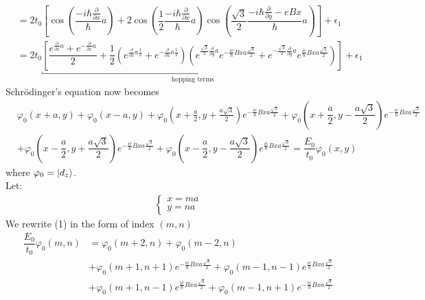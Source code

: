 \documentclass{report}
\newcommand{\f}[2]{\dfrac{#1}{#2}}
\begin{document}
\begin{align*}
	 & = 2t_{0} \left[ \cos\left( \f{-i\hbar \frac{\partial}{\partial x}}{\hbar}a \right) + 2\cos\left( \f{1}{2}\f{-i\hbar\frac{\partial}{\partial x}}{\hbar}a \right) \cos\left( \f{\sqrt{3}}{2}\f{-i\hbar \frac{\partial}{\partial y} - eBx}{\hbar}a \right)  \right] + \epsilon_1                                                                                                                                                                                                                    \\
	 & = 2t_{0} \underbracket{\left[ \f{e^{\frac{\partial}{\partial x}a} + e^{-\frac{\partial}{\partial x}a}}{2} + \f{1}{2} \left( e^{\frac{\partial}{\partial x} a \frac{1}{2}} + e^{-\frac{\partial}{\partial x} a \frac{1}{2}} \right) \left( e^{\frac{\sqrt{3}}{2}\frac{\partial}{\partial y}a } e^{-\frac{ie}{\hbar} Bxa\frac{\sqrt{3}}{2}} + e^{-\frac{\sqrt{3}}{2}\frac{\partial}{\partial y}a } e^{\frac{ie}{\hbar} Bxa\frac{\sqrt{3}}{2}} \right) \right]}_{\text{hopping terms}} + \epsilon_1
\end{align*}
Schr\"{o}dinger's equation now becomes
\begin{align*}
	 & \varphi_{0}(x+a,y) + \varphi_{0}(x-a,y) +  \varphi_{0}(x + \frac{a}{2}, y +\frac{a\sqrt{3}}{2}) e^{-\frac{ie}{\hbar}Bxa\frac{\sqrt{3}}{2}} +\varphi_{0}(x+\f{a}{2},y - \f{a\sqrt{3}}{2}) e^{-\frac{ie}{\hbar}Bxa\frac{\sqrt{3}}{2}} \\
	 & + \varphi_{0}(x-\f{a}{2}, y +\f{a\sqrt{3}}{2}) e^{-\frac{ie}{\hbar}Bxa\frac{\sqrt{3}}{2}}
	+\varphi_{0}(x-\f{a}{2},y-\f{a\sqrt{3}}{2})e^{\frac{ie}{\hbar}Bxa\frac{\sqrt{3}}{2}} = \f{E_{0}}{t_0} \varphi_{0}(x,y) \tag{1}
\end{align*}
where $\varphi_{0} = \ket{d_z}$.\\
Let:
\begin{align*}
	\begin{cases}
		x = ma \\
		y = na
	\end{cases}
\end{align*}
We rewrite (1) in the form of index $(m,n)$
\begin{align*}
	\f{E_{0}}{t_0}\varphi_{0}(m,n)
	 & = \varphi_{0}(m+2,n) + \varphi_{0}(m-2,n)                                                                                                 \\
	 & + \varphi_{0}(m+1,n+1) e^{-\frac{ie}{\hbar}Bxa\frac{\sqrt{3}}{2}} + \varphi_{0}(m-1,n-1)e^{\frac{ie}{\hbar}Bxa\frac{\sqrt{3}}{2}}         \\
	 & + \varphi_{0}(m+1,n-1) e^{\frac{ie}{\hbar}Bxa\frac{\sqrt{3}}{2}} + \varphi_{0}(m-1,n+1)e^{-\frac{ie}{\hbar}Bxa\frac{\sqrt{3}}{2}} \tag{2}
\end{align*}
\end{document}
